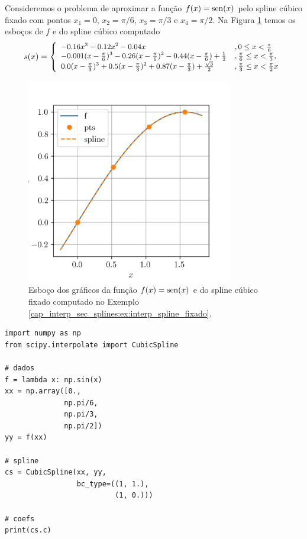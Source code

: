 \begin{ex}\label{cap_interp_sec_splines:ex:interp_spline_fixado}
  Consideremos o problema de aproximar a função $f(x)=\operatorname{sen}(x)$ pelo spline cúbico fixado com pontos $x_1=0$, $x_2=\pi/6$, $x_3=\pi/3$ e $x_4=\pi/2$. Na Figura \ref{cap_interp_sec_splines:fig:interp_spline_fixado} temos os esboços de $f$ e do spline cúbico computado
  \begin{equation}
    s(x) = \small\left\{
      \begin{array}{ll}
        -0.16x^3 - 0.12x^2 - 0.04x &, 0\leq x < \frac{\pi}{6}\\
        -0.001(x-\frac{\pi}{6})^3 - 0.26(x-\frac{\pi}{6})^2 - 0.44(x-\frac{\pi}{6}) + \frac{1}{2} &, \frac{\pi}{6} \leq x < \frac{\pi}{3},\\
        0.0(x-\frac{\pi}{3})^3 + 0.5(x-\frac{\pi}{3})^2 + 0.87(x-\frac{\pi}{3}) + \frac{\sqrt{3}}{2} &, \frac{\pi}{3} \leq x < \frac{\pi}{2}x
      \end{array}
\right.
  \end{equation}

  \begin{figure}[H]
    \centering
    \includegraphics[width=0.8\textwidth]{./cap_interp/dados/fig_CSFixado/fig}
    \caption{Esboço dos gráficos da função $f(x)=\operatorname{sen}(x)$ e do spline cúbico fixado computado no Exemplo \ref{cap_interp_sec_splines:ex:interp_spline_fixado}.}
    \label{cap_interp_sec_splines:fig:interp_spline_fixado}
  \end{figure}

\begin{lstlisting}
import numpy as np
from scipy.interpolate import CubicSpline

# dados
f = lambda x: np.sin(x)
xx = np.array([0.,
              np.pi/6,
              np.pi/3,
              np.pi/2])
yy = f(xx)

# spline
cs = CubicSpline(xx, yy,
                 bc_type=((1, 1.),
                          (1, 0.)))

# coefs
print(cs.c)
\end{lstlisting}

\end{ex}

